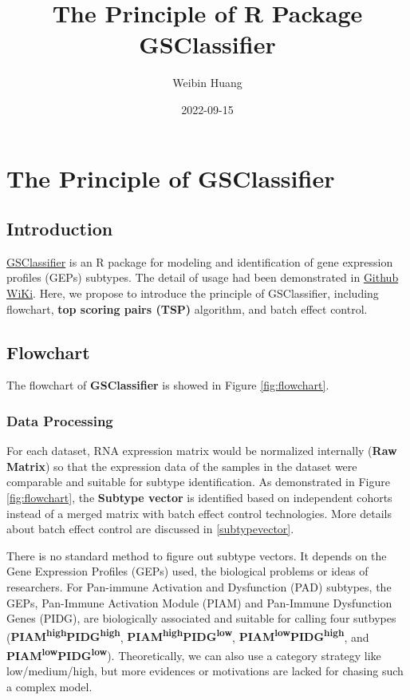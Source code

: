 \documentclass[
  12pt,
]{book}
\title{The Principle of R Package GSClassifier}
\author{Weibin Huang}
\date{2022-09-15}
\begin{document}
\maketitle

{
\hypersetup{linkcolor=}
\setcounter{tocdepth}{2}
\tableofcontents
}
\hypertarget{the-principle-of-gsclassifier}{%
\chapter{The Principle of GSClassifier}\label{the-principle-of-gsclassifier}}

\hypertarget{introduction}{%
\section{Introduction}\label{introduction}}

\href{https://github.com/huangwb8/GSClassifier}{GSClassifier} is an R package for modeling and identification of gene expression profiles (GEPs) subtypes. The detail of usage had been demonstrated in \href{https://github.com/huangwb8/GSClassifier/wiki}{Github WiKi}. Here, we propose to introduce the principle of GSClassifier, including flowchart, \textbf{top scoring pairs (TSP)} algorithm, and batch effect control.

\hypertarget{flowchart}{%
\section{Flowchart}\label{flowchart}}

The flowchart of \textbf{GSClassifier} is showed in Figure \ref{fig:flowchart}.

\hypertarget{data-processing}{%
\subsection{Data Processing}\label{data-processing}}

For each dataset, RNA expression matrix would be normalized internally (\textbf{Raw Matrix}) so that the expression data of the samples in the dataset were comparable and suitable for subtype identification. As demonstrated in Figure \ref{fig:flowchart}, the \textbf{Subtype vector} is identified based on independent cohorts instead of a merged matrix with batch effect control technologies. More details about batch effect control are discussed in \ref{subtypevector}.

There is no standard method to figure out subtype vectors. It depends on the Gene Expression Profiles (GEPs) used, the biological problems or ideas of researchers. For Pan-immune Activation and Dysfunction (PAD) subtypes, the GEPs, Pan-Immune Activation Module (PIAM) and Pan-Immune Dysfunction Genes (PIDG), are biologically associated and suitable for calling four sutbypes (\textbf{PIAM\textsuperscript{high}PIDG\textsuperscript{high}}, \textbf{PIAM\textsuperscript{high}PIDG\textsuperscript{low}}, \textbf{PIAM\textsuperscript{low}PIDG\textsuperscript{high}}, and \textbf{PIAM\textsuperscript{low}PIDG\textsuperscript{low}}). Theoretically, we can also use a category strategy like low/medium/high, but more evidences or motivations are lacked for chasing such a complex model.
\end{document}
